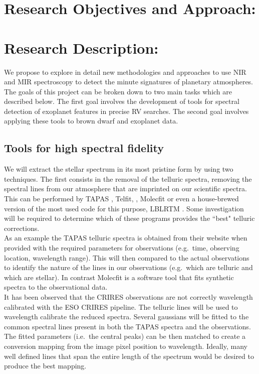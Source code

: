 \documentclass[pdftex,12pt,a4paper]{article}
\begin{document}
\pagebreak
\section{Research Objectives and Approach:}
\section*{Research Description:}
We propose to explore in detail new methodologies and approaches to use NIR and MIR spectroscopy to detect the minute signatures of planetary atmospheres. The goals of this project can be broken down to two main tasks which are described below. The first goal involves the development of tools for spectral detection of exoplanet features in precise {RV} searches. The second goal involves applying these tools to brown dwarf and exoplanet data.\\

\subsection {Tools for high spectral fidelity}

We will extract the stellar spectrum in its most pristine form by using two techniques. The first consists in the removal of the telluric spectra, removing the spectral lines from our atmosphere that are imprinted on our scientific spectra. This can be performed by {TAPAS} \citep{Bertaux2014}, Telfit, \citep{Telfit2014}, Molecfit \citep{Molecfit2015, Kausch2015} or even a house-brewed version of the most used code for this purpose, LBLRTM \citep{LBLRTM2014}. Some investigation will be required to determine which of these programs provides the ``best" telluric corrections.\\

As an example the {TAPAS} telluric spectra is obtained from their website when provided with the required parameters for observations (e.g.\ time, observing location, wavelength range). This will then compared to the actual observations to identify the nature of the lines in our observations (e.g.\ which are telluric and which are stellar). In contrast Molecfit is a software tool that fits synthetic spectra to the observational data. \\

It has been observed that the CRIRES observations are not correctly wavelength calibrated with the ESO CRIRES pipeline. The telluric lines will be used to wavelength calibrate the reduced spectra. Several gaussians will be fitted to the common spectral lines present in both the {TAPAS} spectra and the observations. The fitted parameters (i.e.\ the central peaks) can be then matched to create a conversion mapping from the image pixel position to wavelength. Ideally, many well defined lines that span the entire length of the spectrum would be desired to produce the best mapping.\\
\end{document}
